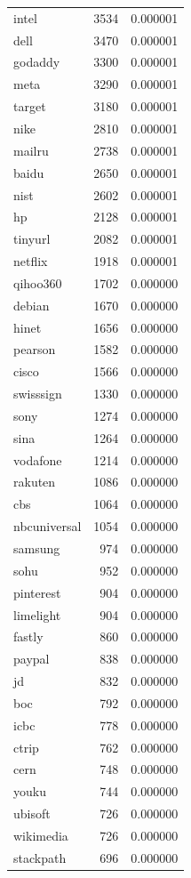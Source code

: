 \begin{tabular}{lrr}
intel & 3534 & 0.000001 \\
dell & 3470 & 0.000001 \\
godaddy & 3300 & 0.000001 \\
meta & 3290 & 0.000001 \\
target & 3180 & 0.000001 \\
nike & 2810 & 0.000001 \\
mailru & 2738 & 0.000001 \\
baidu & 2650 & 0.000001 \\
nist & 2602 & 0.000001 \\
hp & 2128 & 0.000001 \\
tinyurl & 2082 & 0.000001 \\
netflix & 1918 & 0.000001 \\
qihoo360 & 1702 & 0.000000 \\
debian & 1670 & 0.000000 \\
hinet & 1656 & 0.000000 \\
pearson & 1582 & 0.000000 \\
cisco & 1566 & 0.000000 \\
swisssign & 1330 & 0.000000 \\
sony & 1274 & 0.000000 \\
sina & 1264 & 0.000000 \\
vodafone & 1214 & 0.000000 \\
rakuten & 1086 & 0.000000 \\
cbs & 1064 & 0.000000 \\
nbcuniversal & 1054 & 0.000000 \\
samsung & 974 & 0.000000 \\
sohu & 952 & 0.000000 \\
pinterest & 904 & 0.000000 \\
limelight & 904 & 0.000000 \\
fastly & 860 & 0.000000 \\
paypal & 838 & 0.000000 \\
jd & 832 & 0.000000 \\
boc & 792 & 0.000000 \\
icbc & 778 & 0.000000 \\
ctrip & 762 & 0.000000 \\
cern & 748 & 0.000000 \\
youku & 744 & 0.000000 \\
ubisoft & 726 & 0.000000 \\
wikimedia & 726 & 0.000000 \\
stackpath & 696 & 0.000000 \\

\end{tabular}
